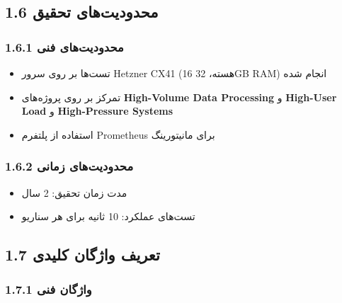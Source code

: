 \documentclass[
]{article}
\providecommand{\tightlist}{%
  \setlength{\itemsep}{0pt}\setlength{\parskip}{0pt}}
\begin{document}
\subsection{1.6 محدودیت‌های
تحقیق}\label{ux645ux62dux62fux648ux62fux6ccux62aux647ux627ux6cc-ux62aux62dux642ux6ccux642}

\subsubsection{1.6.1 محدودیت‌های
فنی}\label{ux645ux62dux62fux648ux62fux6ccux62aux647ux627ux6cc-ux641ux646ux6cc}

\begin{itemize}
\tightlist
\item
  تست‌ها بر روی سرور Hetzner CX41 (16 هسته، 32GB RAM) انجام شده
\item
  تمرکز بر روی پروژه‌های \textbf{High-Volume Data Processing} و
  \textbf{High-User Load} و \textbf{High-Pressure Systems}
\item
  استفاده از پلتفرم Prometheus برای مانیتورینگ
\end{itemize}

\subsubsection{1.6.2 محدودیت‌های
زمانی}\label{ux645ux62dux62fux648ux62fux6ccux62aux647ux627ux6cc-ux632ux645ux627ux646ux6cc}

\begin{itemize}
\tightlist
\item
  مدت زمان تحقیق: 2 سال
\item
  تست‌های عملکرد: 10 ثانیه برای هر سناریو
\end{itemize}

\subsection{1.7 تعریف واژگان
کلیدی}\label{ux62aux639ux631ux6ccux641-ux648ux627ux698ux6afux627ux646-ux6a9ux644ux6ccux62fux6cc}

\subsubsection{1.7.1 واژگان
فنی}\label{ux648ux627ux698ux6afux627ux646-ux641ux646ux6cc}
\end{document}

